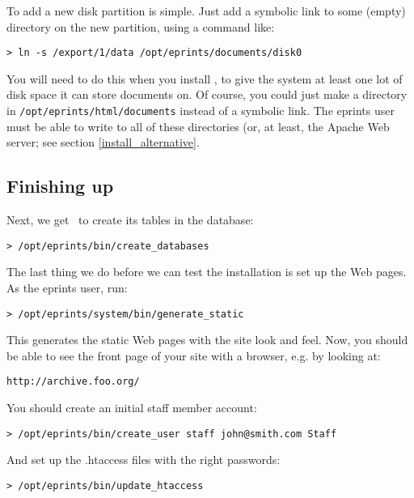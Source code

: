 {To add a new disk partition is simple. Just add a symbolic link to some (empty) directory on the new partition, using a command like:

\begin{verbatim}
> ln -s /export/1/data /opt/eprints/documents/disk0
\end{verbatim}

You will need to do this when you install \eprints, to give the system at least one lot of disk space it can store documents on. Of course, you could just make a directory in {\tt /opt/eprints/html/documents} instead of a symbolic link. The eprints user must be able to write to all of these directories (or, at least, the Apache Web server; see section \ref{install_alternative}.


\subsection{Finishing up}

Next, we get \eprints\ to create its tables in the database:

\begin{verbatim}
> /opt/eprints/bin/create_databases
\end{verbatim}

The last thing we do before we can test the installation is set up the Web pages. As the eprints user, run:

\begin{verbatim}
> /opt/eprints/system/bin/generate_static
\end{verbatim}

This generates the static Web pages with the site look and feel. Now, you should be able to see the front page of your site with a browser, e.g. by looking at:

\begin{verbatim}
http://archive.foo.org/
\end{verbatim}

You should create an initial staff member account:

\begin{verbatim}
> /opt/eprints/bin/create_user staff john@smith.com Staff
\end{verbatim}

And set up the .htaccess files with the right passwords:

\begin{verbatim}
> /opt/eprints/bin/update_htaccess
\end{verbatim}

}
